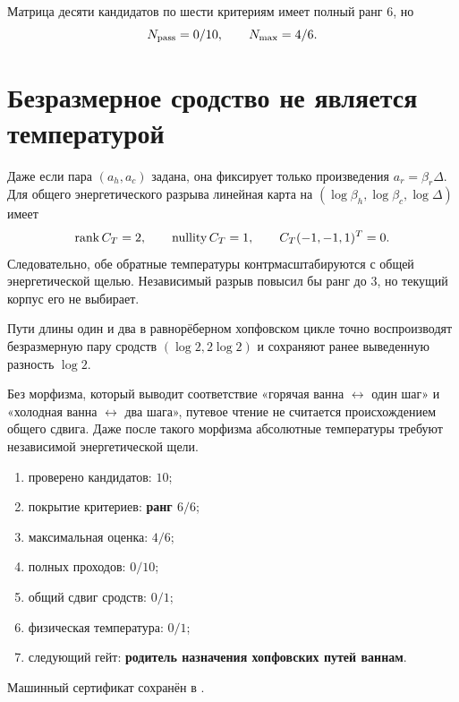 Матрица десяти кандидатов по шести критериям имеет полный ранг $6$, но
\begin{equation}
 N_{\rm pass}=0/10,\qquad N_{\rm max}=4/6.
 \label{eq:v10-common-affinity-candidate-ledger}
\end{equation}

\section{Безразмерное сродство не является температурой}

Даже если пара $(a_h,a_c)$ задана, она фиксирует только произведения
$a_r=\beta_r\Delta$. Для общего энергетического разрыва линейная карта на
$(\log\beta_h,\log\beta_c,\log\Delta)$ имеет
\begin{equation}
 \operatorname{rank} C_T=2,\qquad \operatorname{nullity}C_T=1,\qquad
 C_T(-1,-1,1)^T=0.
 \label{eq:v10-common-affinity-temperature-kernel}
\end{equation}
Следовательно, обе обратные температуры контрмасштабируются с общей
энергетической щелью. Независимый разрыв повысил бы ранг до $3$, но текущий
корпус его не выбирает.

\begin{theorem}
Пути длины один и два в равнорёберном хопфовском цикле точно воспроизводят
безразмерную пару сродств $(\log2,2\log2)$ и сохраняют ранее выведенную
разность $\log2$.
\end{theorem}

\begin{nogocriterion}
Без морфизма, который выводит соответствие
«горячая ванна $\leftrightarrow$ один шаг» и
«холодная ванна $\leftrightarrow$ два шага», путевое чтение не считается
происхождением общего сдвига. Даже после такого морфизма абсолютные
температуры требуют независимой энергетической щели.
\end{nogocriterion}

\begin{protocol}\begin{enumerate}
\item проверено кандидатов: \textbf{$10$};
\item покрытие критериев: \textbf{ранг $6/6$};
\item максимальная оценка: \textbf{$4/6$};
\item полных проходов: \textbf{$0/10$};
\item общий сдвиг сродств: \textbf{$0/1$};
\item физическая температура: \textbf{$0/1$};
\item следующий гейт: \textbf{родитель назначения хопфовских путей ваннам}.
\end{enumerate}\end{protocol}

Машинный сертификат сохранён в
.